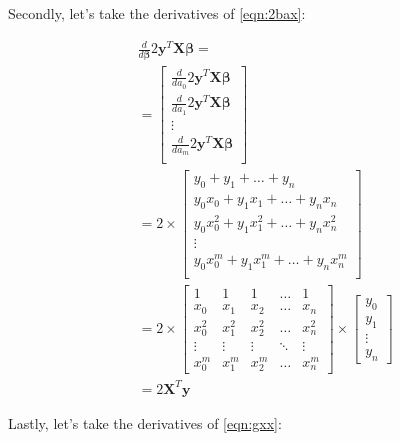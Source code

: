 \documentclass{article}
\newcommand{\y}{\mathbf{y}}
\newcommand{\X}{\mathbf{X}}
\newcommand{\B}{\boldsymbol\beta} %
\begin{document}
Secondly, let's take the derivatives of \ref{eqn:2bax}:

\begin{equation}
\begin{split}
    & \frac{d}{d\B} 2 \y ^T \X \B = \\
    & =
    \begin{bmatrix}
        \frac{d}{d a_0} 2 \y ^T \X \B \\
        \frac{d}{d a_1} 2 \y ^T \X \B \\
        \vdots \\
        \frac{d}{d a_m} 2 \y ^T \X \B \\
    \end{bmatrix}\\
    & = 2 \times
    \begin{bmatrix}
        y_0 + y_1 + \ldots + y_n \\
        y_0x_0 + y_1x_1 + \ldots + y_nx_n \\
        y_0x_0^2 + y_1x_1^2 + \ldots + y_nx_n^2 \\
        \vdots \\
        y_0x_0^m + y_1x_1^m + \ldots + y_nx_n^m \\
    \end{bmatrix}\\
    &= 2 \times
    \begin{bmatrix}
        1 & 1 & 1 & \ldots & 1 \\
        x_0 & x_1 & x_2 & \ldots & x_n \\
        x_0^2 & x_1^2 & x_2 ^2 & \ldots & x_n^2 \\
        \vdots & \vdots & \vdots & \ddots & \vdots \\
        x_0^m & x_1^m & x_2 ^m & \ldots & x_n^m
    \end{bmatrix}
    \times
    \begin{bmatrix}
        y_0\\
        y_1\\
        \vdots\\
        y_n
    \end{bmatrix}\\
    &= 2 \X ^T \y
\end{split}
\end{equation}

Lastly, let's take the derivatives of \ref{eqn:gxx}:
\end{document}
